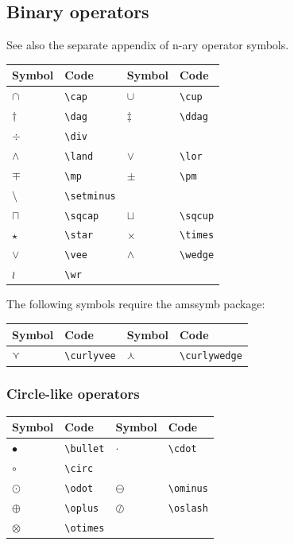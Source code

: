 \documentclass[a4paper,14pt]{extarticle}
\begin{document}
\newpage

\subsection{Binary operators}

See also the separate appendix of n-ary operator symbols.

\begin{center}
\begin{tabular}{|p{}p{}|p{}p{}|}
\hline
Symbol & Code & Symbol & Code \\
\hline
\(\cap\) & \verb=\cap= & \(\cup\) & \verb=\cup= \\
\(\dag\) & \verb=\dag= & \(\ddag\) & \verb=\ddag=\\
\(\div\) & \verb=\div= && \\
\(\land\) & \verb=\land= & \(\lor\) & \verb=\lor= \\
\(\mp\) & \verb=\mp= & \(\pm\) & \verb=\pm=\\
\(\setminus\) & \verb=\setminus= & & \\
\(\sqcap\) & \verb=\sqcap= & \(\sqcup\) & \verb=\sqcup= \\
\(\star\) & \verb=\star= & \(\times\) & \verb=\times= \\
\(\vee\) & \verb=\vee= & \(\wedge\) & \verb=\wedge= \\
\(\wr\) & \verb=\wr= & & \\
\hline
\end{tabular}
\end{center}

The following symbols require the amssymb package:
\begin{center}
\begin{tabular}{|p{}p{}|p{}p{}|}
\hline
Symbol & Code & Symbol & Code \\
\hline
\(\curlyvee\) & \verb=\curlyvee= & \(\curlywedge\) & \verb=\curlywedge= \\
\hline
\end{tabular}
\end{center}

\subsubsection{Circle-like operators}

\begin{center}
\begin{tabular}{|p{}p{}|p{}p{}|}
\hline
Symbol & Code & Symbol & Code \\
\hline
\(\bullet\) & \verb=\bullet= & \(\cdot\) & \verb=\cdot= \\
\(\circ\) & \verb=\circ= & & \\
\(\odot\) & \verb=\odot= & \(\ominus\) & \verb=\ominus= \\ 
\(\oplus\) & \verb=\oplus= & \(\oslash\) & \verb=\oslash= \\
\(\otimes\) & \verb=\otimes= & & \\
\hline
\end{tabular}
\end{center}
\end{document}
